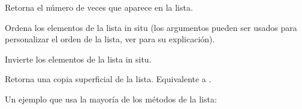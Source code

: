 \documentclass[a4,10pt,spanish]{sphinxmanual}
\begin{document}
\begin{fulllineitems}
\sphinxAtStartPar
Retorna el número de veces que  aparece en la lista.

\end{fulllineitems}



\begin{fulllineitems}
\sphinxAtStartPar
Ordena los elementos de la lista in situ (los argumentos pueden ser usados para personalizar el orden de la lista, ver  para su explicación).

\end{fulllineitems}



\begin{fulllineitems}
\sphinxAtStartPar
Invierte los elementos de la lista in situ.

\end{fulllineitems}



\begin{fulllineitems}
\sphinxAtStartPar
Retorna una copia superficial de la lista. Equivalente a .

\end{fulllineitems}


\sphinxAtStartPar
Un ejemplo que usa la mayoría de los métodos de la lista:
\end{document}
